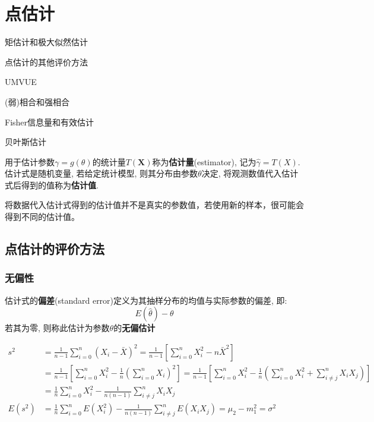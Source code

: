 \chapter{点估计}

\begin{introduction}[考试重点]
    \item 矩估计和极大似然估计
    \item 点估计的其他评价方法
    \item UMVUE
    \item (弱)相合和强相合
    \item Fisher信息量和有效估计
    \item 贝叶斯估计
\end{introduction}

\begin{definition}[点估计]
    用于估计参数$\gamma = g(\theta)$的统计量$T(\mathbf{X})$称为\textbf{估计量}(estimator), 记为$\hat{\gamma} = T(X)$. 估计式是随机变量, 若给定统计模型, 则其分布由参数$\theta$决定, 将观测数值代入估计式后得到的值称为\textbf{估计值}.
\end{definition}

将数据代入估计式得到的估计值并不是真实的参数值，若使用新的样本，很可能会得到不同的估计值。

\section{点估计的评价方法}

\subsection{无偏性}

\begin{definition}[无偏估计]
    估计式的\textbf{偏差}(standard error)定义为其抽样分布的均值与实际参数的偏差, 即:
    \[ E(\hat{\theta})-\theta \]
    若其为零, 则称此估计为参数$\theta$的\textbf{无偏估计}
\end{definition}

\begin{example}[方差的无偏估计]
    \begin{align*}
        s^2    & = \frac1{n-1} \sum_{i=0}^n (X_i-\bar{X})^2=\frac1{n-1} [\sum_{i=0}^n X_i^2 - n\bar{X}^2]                                                                         \\
               & =\frac1{n-1} [\sum_{i=0}^n X_i^2 - \frac1n  (\sum_{i=0}^n X_i)^2] = \frac1{n-1} [\sum_{i=0}^n X_i^2 - \frac1n  (\sum_{i=0}^n X_i^2 + \sum_{i \neq j}^n X_i X_j)] \\
               & = \frac1n  \sum_{i=0}^n X_i^2 - \frac1{n(n-1)} \sum_{i \neq j}^n X_i X_j                                                                                         \\
        E(s^2) & = \frac1n  \sum_{i=0}^n E(X_i^2) - \frac1{n(n-1)} \sum_{i \neq j}^n E(X_i X_j) = \mu_2-m_1^2=\sigma^2
    \end{align*}
\end{example}

